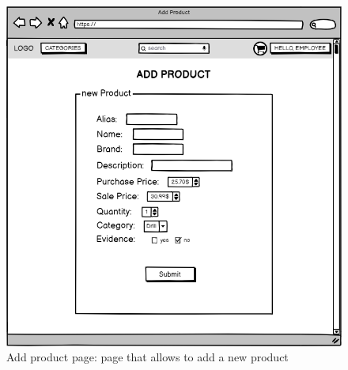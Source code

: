     \begin{figure}[H]
        \centering
        \includegraphics[width=\textwidth,height=0.7\textheight,keepaspectratio]{mockups/addProductPageMockup.png}
            \caption{Add product page: page that allows to add a new product}
            \label{fig:ProductManagementAdd}
    \end{figure}




